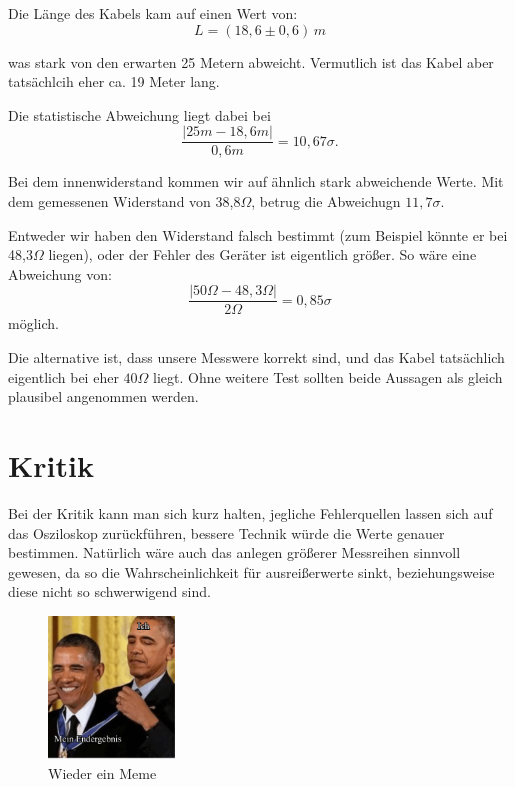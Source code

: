 Die Länge des Kabels kam auf einen Wert von: 
\begin{equation}
\boxed{
    L = (18,6 \pm 0,6) \, m
}
\end{equation}

was stark von den erwarten 25 Metern abweicht. Vermutlich ist das Kabel aber tatsächlcih eher ca. 19 Meter lang.

Die statistische Abweichung liegt dabei bei
\begin{equation}
    \frac{\left| 25m-18,6m \right|}{0,6m} = 10,67\sigma.
\end{equation}

Bei dem innenwiderstand kommen wir auf ähnlich stark abweichende Werte. Mit dem gemessenen Widerstand von 38,8$\Omega$, betrug die Abweichugn $11,7\sigma$.

Entweder wir haben den Widerstand falsch bestimmt (zum Beispiel könnte er bei 48,3$\Omega$ liegen), oder der Fehler des Geräter ist eigentlich größer. So wäre eine Abweichung von:
\begin{equation}
    \frac{\left| 50 \Omega - 48,3 \Omega  \right|}{2 \Omega} = 0,85\sigma
\end{equation}
möglich.

Die alternative ist, dass unsere Messwere korrekt sind, und das Kabel tatsächlich eigentlich bei eher $40\Omega$ liegt. Ohne weitere Test sollten beide Aussagen als gleich plausibel angenommen werden.

\section{Kritik}

Bei der Kritik kann man sich kurz halten, jegliche Fehlerquellen lassen sich auf das Osziloskop zurückführen, bessere Technik würde die Werte genauer bestimmen. Natürlich wäre auch das anlegen größerer Messreihen sinnvoll gewesen, da so die Wahrscheinlichkeit für ausreißerwerte sinkt, beziehungsweise diese nicht so schwerwigend sind.

\begin{figure}[h!]
    \centering
    \includegraphics[width=0.3\textwidth]{img/25/memes/ergebnisse.pdf}
    \caption{Wieder ein Meme}
\end{figure}